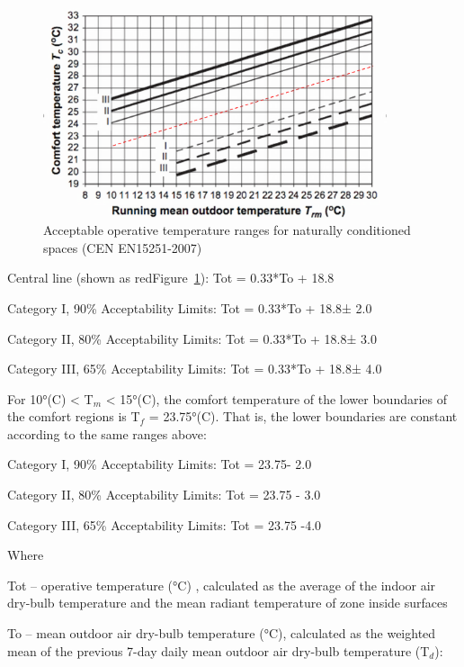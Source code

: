 \begin{figure}[hbtp] %
\centering
\includegraphics[width=0.9\textwidth, height=0.9\textheight, keepaspectratio=true]{media/image6820.png}
\caption{Acceptable operative temperature ranges for naturally conditioned spaces (CEN EN15251-2007) \protect \label{fig:acceptable-operative-temperature-ranges-for-001}}
\end{figure}

Central line (shown as redFigure~\ref{fig:acceptable-operative-temperature-ranges-for-001}): Tot = 0.33*To + 18.8

Category I, 90\% Acceptability Limits: Tot = 0.33*To + 18.8± 2.0

Category II, 80\% Acceptability Limits: Tot = 0.33*To + 18.8± 3.0

Category III, 65\% Acceptability Limits: Tot = 0.33*To + 18.8± 4.0

For 10°(C) \textless{} T\(_{m}\) \textless{} 15°(C), the comfort temperature of the lower boundaries of the comfort regions is T\(_{f}\) = 23.75°(C). That is, the lower boundaries are constant according to the same ranges above:

Category I, 90\% Acceptability Limits: Tot = 23.75- 2.0

Category II, 80\% Acceptability Limits: Tot = 23.75 - 3.0

Category III, 65\% Acceptability Limits: Tot = 23.75 -4.0

Where

Tot -- operative temperature (°C) , calculated as the average of the indoor air dry-bulb temperature and the mean radiant temperature of zone inside surfaces

To -- mean outdoor air dry-bulb temperature (°C), calculated as the weighted mean of the previous 7-day daily mean outdoor air dry-bulb temperature (T\(_{d}\)):

